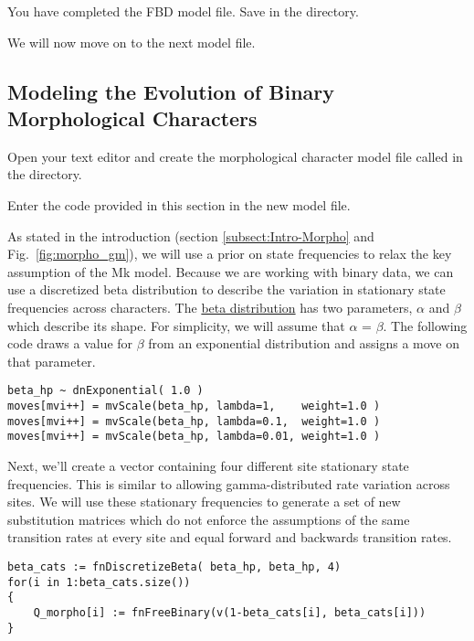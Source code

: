 {\begin{framed}
You have completed the FBD model file. Save  in the  directory.

We will now move on to the next model file.
\end{framed}}

\bigskip

\subsection{Modeling the Evolution of Binary Morphological Characters}\label{subsect:Exercise-ModelMorph}

{\begin{framed}
Open your text editor and create the morphological character model file called {\textcolor{red}{}} in the  directory.

Enter the \Rev code provided in this section in the new model file.
\end{framed}}

As stated in the introduction (section \ref{subsect:Intro-Morpho} and Fig.\ \ref{fig:morpho_gm}), we will use a prior on state frequencies to relax the key assumption of the Mk model. 
Because we are working with binary data, we can use a discretized beta distribution to describe the variation in stationary state frequencies across characters. 
The \href{https://en.wikipedia.org/wiki/Beta_distribution}{beta distribution} has two parameters, $\alpha$ and $\beta$ which describe its shape. 
For simplicity, we will assume that $\alpha$ = $\beta$. 
The following code draws a value for $\beta$ from an exponential distribution and assigns a move on that parameter.
{\tt \begin{snugshade*}
\begin{lstlisting}
beta_hp ~ dnExponential( 1.0 )
moves[mvi++] = mvScale(beta_hp, lambda=1,    weight=1.0 )
moves[mvi++] = mvScale(beta_hp, lambda=0.1,  weight=1.0 )
moves[mvi++] = mvScale(beta_hp, lambda=0.01, weight=1.0 )
\end{lstlisting}
\end{snugshade*}}

Next, we'll create a vector containing four different site stationary state frequencies. 
This is similar to allowing gamma-distributed rate variation across sites. 
We will use these stationary frequencies to generate a set of new substitution matrices which do not enforce the assumptions of the same transition rates at every site and equal forward and backwards transition rates.
{\tt \begin{snugshade*}
\begin{lstlisting}
beta_cats := fnDiscretizeBeta( beta_hp, beta_hp, 4)
for(i in 1:beta_cats.size())
{
    Q_morpho[i] := fnFreeBinary(v(1-beta_cats[i], beta_cats[i]))
}
\end{lstlisting}
\end{snugshade*}}


